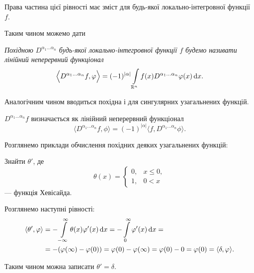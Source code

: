 Права частина цієї рівності має зміст для будь-якої локально-інтегровної функції $f$. \medskip \allowbreak

Таким чином можемо дати
\begin{definition}
	\it{Похідною} $D^{\alpha_1 \ldots \alpha_n}$ будь-якої локально-інтегровної функції $f$ будемо називати лінійний неперервний функціонал
	\begin{equation}
		\Big\langle D^{\alpha_1 \ldots \alpha_n} f, \varphi \Big\rangle = (-1)^{|\alpha|} \displaystyle\int\limits_{\mathbb{R}^n} f(x) D^{\alpha_1 \ldots \alpha_n} \varphi(x) \mathop{}\!\mathrm{d} x.	
	\end{equation}
\end{definition}

Аналогічним чином вводиться похідна і для сингулярних узагальнених функцій.
\begin{definition}
	$D^{\alpha_1 \ldots \alpha_n} f$ визначається як лінійний неперервний функціонал
	\begin{equation}
		\Big\langle D^{\alpha_1 \ldots \alpha_n} f, \phi \Big\rangle = (-1)^{|\alpha|} \Big\langle f, D^{\alpha_1 \ldots \alpha_n} \phi \Big\rangle.
	\end{equation}
\end{definition}

Розглянемо приклади обчислення похідних деяких узагальнених функцій:
\begin{example}
	Знайти $\theta'$, де 
	\begin{equation}
		\theta(x) = \begin{cases}
			0, & x \le 0, \\
			1, & 0 < x
		\end{cases}	
	\end{equation}
	--- функція Хевісайда.
\end{example}

\begin{solution}
	Розглянемо наступні рівності:
	\begin{equation}
		\begin{aligned}
			\left\langle \theta', \varphi \right\rangle &= - \displaystyle\int\limits_{-\infty}^\infty \theta(x) \varphi'(x) \mathop{}\!\mathrm{d} x = - \displaystyle\int\limits_{0}^\infty \varphi'(x) \mathop{}\!\mathrm{d} x = \\
			&= - (\varphi(\infty) - \varphi(0)) = \varphi(0) - \varphi(\infty) = \varphi(0) - 0 = \varphi(0) = \langle \delta, \varphi \rangle.	
		\end{aligned}
	\end{equation}

	Таким чином можна записати $\theta' = \delta$.
\end{solution}

